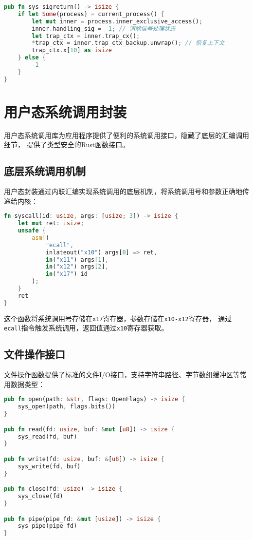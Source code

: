 \begin{lstlisting}[language=Rust,caption={信号处理返回}, label={lst:sys-sigreturn}]
pub fn sys_sigreturn() -> isize {
    if let Some(process) = current_process() {
        let mut inner = process.inner_exclusive_access();
        inner.handling_sig = -1; // 清除信号处理状态
        let trap_ctx = inner.trap_cx();
        *trap_ctx = inner.trap_ctx_backup.unwrap(); // 恢复上下文
        trap_ctx.x[10] as isize
    } else {
        -1
    }
}
\end{lstlisting}

\section{用户态系统调用封装}

用户态系统调用库为应用程序提供了便利的系统调用接口，隐藏了底层的汇编调用细节，
提供了类型安全的Rust函数接口。

\subsection{底层系统调用机制}

用户态封装通过内联汇编实现系统调用的底层机制，将系统调用号和参数正确地传递给内核：

\begin{lstlisting}[language=Rust,caption={底层系统调用实现}, label={lst:syscall-asm}]
fn syscall(id: usize, args: [usize; 3]) -> isize {
    let mut ret: isize;
    unsafe {
        asm!(
            "ecall",
            inlateout("x10") args[0] => ret,
            in("x11") args[1],
            in("x12") args[2],
            in("x17") id
        );
    }
    ret
}
\end{lstlisting}

这个函数将系统调用号存储在\texttt{x17}寄存器，参数存储在\texttt{x10-x12}寄存器，
通过\texttt{ecall}指令触发系统调用，返回值通过\texttt{x10}寄存器获取。

\subsection{文件操作接口}

文件操作函数提供了标准的文件I/O接口，支持字符串路径、字节数组缓冲区等常用数据类型：

\begin{lstlisting}[language=Rust,caption={用户态文件操作}, label={lst:user-file-ops}]
pub fn open(path: &str, flags: OpenFlags) -> isize {
    sys_open(path, flags.bits())
}

pub fn read(fd: usize, buf: &mut [u8]) -> isize {
    sys_read(fd, buf)
}

pub fn write(fd: usize, buf: &[u8]) -> isize {
    sys_write(fd, buf)
}

pub fn close(fd: usize) -> isize {
    sys_close(fd)
}

pub fn pipe(pipe_fd: &mut [usize]) -> isize {
    sys_pipe(pipe_fd)
}
\end{lstlisting}

